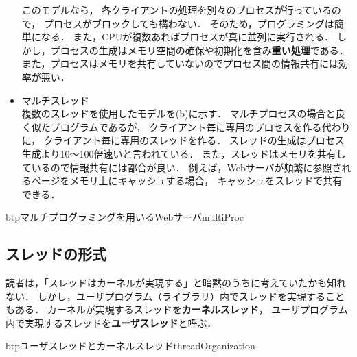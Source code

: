 \begin{itemize}
このモデルなら，
各クライアントの処理を別々のプロセスが行っているので，
プロセスがブロックしても構わない．
そのため，プログラミングは簡単になる．
また，CPUが複数あればプロセスが真に並列に実行される．
しかし，プロセスの生成はメモリ空間の確保や初期化を含み{\bf 重い処理}である．
また，プロセスはメモリを共有していないのでプロセス間の情報共有には効率が悪い．

\item マルチスレッド \\
複数のスレッドを使用したモデルを(b)に示す．
マルチプロセスの場合と良く似たプログラムであるが，
クライアント毎に専用のプロセスを作る代わりに，
クライアント毎に専用のスレッドを作る．
スレッドの生成はプロセス生成より10〜100倍速いと言われている\cite{lightWeight}．
また，スレッドはメモリを共有しているので情報共有には都合が良い．
例えば，Webサーバが頻繁に参照されるページをメモリ上にキャッシュする場合，
キャッシュをスレッドで共有できる．
\end{itemize}

\begin{myfig}{btp}{マルチプログラミングを用いるWebサーバ}{multiProc}

\vspace{0.8cm}

\end{myfig}

\subsection{スレッドの形式}
読者は，「スレッドはカーネルが実現する」と暗黙のうちに考えていたかも知れない．
しかし，ユーザプログラム（ライブラリ）内でスレッドを実現することもある．
カーネルが実現するスレッドを{\bf カーネルスレッド}，
ユーザプログラム内で実現するスレッドを{\bf ユーザスレッド}と呼ぶ．

\begin{myfig}{btp}{ユーザスレッドとカーネルスレッド}{threadOrganization}

\vspace{0.8cm}

\end{myfig}

